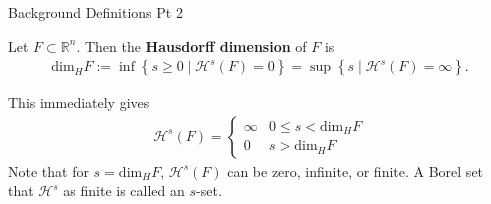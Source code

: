 \documentclass[10pt]{beamer}
\begin{document}
\begin{frame}{Background Definitions Pt 2}

	\begin{definition}
	Let \(F \subset \mathbb{R}^{n}\). Then the \textbf{Hausdorff dimension} of \(F\) is
	\begin{align*}
		\textrm{dim}_H F := \inf \left\{s \geq 0 \mid \mathcal{H}^{s}(F) = 0 \right\} = \sup \left\{s \mid \mathcal{H}^{s}(F) = \infty \right\} .
	\end{align*}
\end{definition}
This immediately gives
\begin{align*}
	\mathcal{H}^{s}(F) = \begin{cases}
		\infty & 0\leq s< \textrm{dim}_H F\\
		0 & s> \textrm{dim}_H F
	\end{cases}
\end{align*}
Note that for \(s =  \textrm{dim}_H F\), \(\mathcal{H}^{s}(F)\) can be zero, infinite, or finite. A Borel set that \(\mathcal{H}^{s}\) as finite is called an \(s\)-set.\\
\end{frame}


\begin{frame}
\end{frame}
\end{document}
